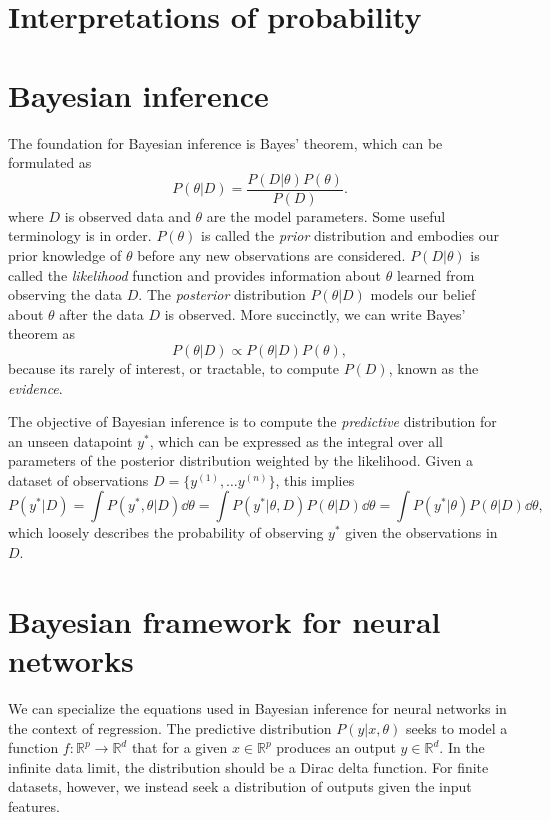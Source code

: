 \section{Interpretations of probability}


\section{Bayesian inference}
The foundation for Bayesian inference is Bayes' theorem, which can be formulated as
\begin{equation}
	P(\theta | D) = \frac{P(D|\theta)P(\theta)}{P(D)}.
\end{equation}
where $D$ is observed data and $\theta$ are the model parameters.
Some useful terminology is in order. $P(\theta)$ is called the \textit{prior} distribution and embodies our prior knowledge of $\theta$ before any new observations are considered. $P(D|\theta)$ is called the \textit{likelihood} function and provides information about $\theta$ learned from observing the data $D$. The \textit{posterior} distribution $P(\theta|D)$ models our belief about $\theta$ after the data $D$ is observed. More succinctly, we can write Bayes' theorem as
\begin{equation}
  P(\theta|D) \propto P(\theta|D)P(\theta),
\end{equation}
because its rarely of interest, or tractable, to compute $P(D)$, known as the \textit{evidence}.

The objective of Bayesian inference is to compute the \textit{predictive} distribution for an unseen datapoint $y^*$, which can be expressed as
the integral over all parameters of the posterior distribution weighted by the likelihood. Given a dataset of observations $D = \{y^{(1)}, \ldots y^{(n)}\}$, this implies
\begin{equation}
  P(y^*|D) = \int P(y^*, \theta|D)\dd\theta =\int P(y^*|\theta, D)P(\theta|D)\dd \theta = \int P(y^*|\theta)P(\theta|D)\dd\theta,
\end{equation}
which loosely describes the probability of observing $y^*$ given the observations in $D$.


\section{Bayesian framework for neural networks}

We can specialize the equations used in Bayesian inference for neural networks in the context of regression.
The predictive distribution $P(y|x, \theta)$ seeks to model a function $f : \mathbb{R}^p \to \mathbb{R}^d$ that for a given $x \in \mathbb{R}^p$ produces an output $y \in \mathbb{R}^d$. In the infinite data limit, the distribution should be a Dirac delta function. For finite datasets, however, we instead seek a distribution of outputs given the input features.


